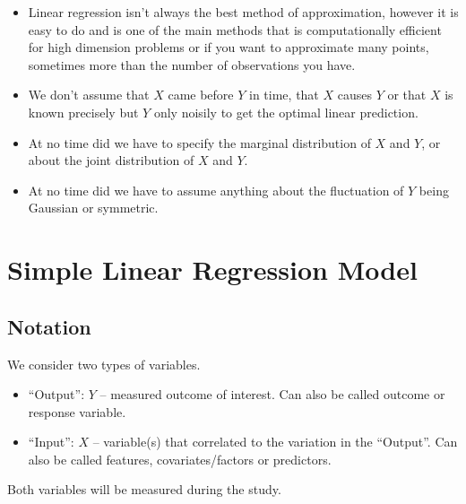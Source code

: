 \documentclass[12 pt]{article}
\begin{document}
\begin{itemize}
\item
Linear regression isn't always the best method of approximation,
however it is easy to do and is one of the main methods that is
computationally efficient for high dimension problems or if you want
to approximate many points, sometimes more than the number of
observations you have.
\item We don't assume that $X$ came before $Y$ in time, that $X$
  causes $Y$ or that $X$ is known precisely but $Y$ only noisily to
  get the optimal linear prediction.
\item At no time did we have to specify the marginal distribution of
  $X$ and $Y$, or about the joint distribution of $X$ and $Y$.
\item At no time did we have to assume anything about the fluctuation
  of $Y$ being Gaussian or symmetric.
\end{itemize}
\section{Simple Linear Regression Model}
\subsection{Notation}
We consider two types of variables.
\begin{itemize}
\item ``Output'': $Y$ \hbox{--} measured outcome of interest. Can also be
  called outcome or response variable.
\item ``Input'': $X$ \hbox{--} variable(s) that correlated to the variation in
  the ``Output''. Can also be called features, covariates/factors or
  predictors.
\end{itemize}
Both variables will be measured during the study.
\end{document}
